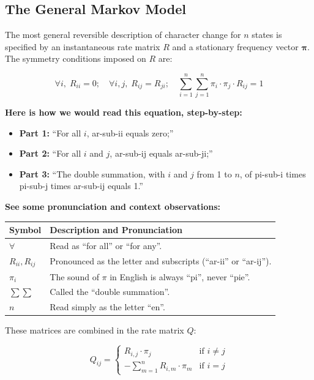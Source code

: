 \subsection{The General Markov Model}

The most general reversible description of character change for $n$ states is specified by an instantaneous rate matrix $R$ and a stationary frequency vector $\symbf{\pi}$. The symmetry conditions imposed on $R$ are:

$$\forall i,\; R_{ii} = 0; \quad \forall i,j,\; R_{ij} = R_{ji}; \quad \sum_{i=1}^{n}\sum_{j=1}^{n} \pi_i \cdot \pi_j \cdot R_{ij} = 1$$

\textbf{Here is how we would read this equation, step-by-step:}

\begin{itemize}
    \item \textbf{Part 1:} ``For all $i$, ar-sub-ii equals zero;''
    \item \textbf{Part 2:} ``For all $i$ and $j$, ar-sub-ij equals ar-sub-ji;''
    \item \textbf{Part 3:} ``The double summation, with $i$ and $j$ from 1 to $n$, of pi-sub-i times pi-sub-j times ar-sub-ij equals 1.''
\end{itemize}

\textbf{See some pronunciation and context observations:}

\begin{center}
\renewcommand{\arraystretch}{1.5}
\begin{tabular}{lp{10cm}}
\toprule
\textbf{Symbol} & \textbf{Description and Pronunciation} \\
\midrule
$\forall$ & Read as ``for all'' or ``for any''. \\
$R_{ii}, R_{ij}$ & Pronounced as the letter and subscripts (``ar-ii'' or ``ar-ij''). \\
$\pi_i$ & The sound of $\pi$ in English is always ``pi'', never ``pie''. \\
$\sum \sum$ & Called the ``double summation''. \\
$n$ & Read simply as the letter ``en''. \\
\bottomrule
\end{tabular}
\end{center}

These matrices are combined in the rate matrix $Q$:

$$Q_{ij} = \begin{cases} R_{i,j} \cdot \pi_j & \text{if } i \neq j \\ -\sum_{m=1}^{n} R_{i,m} \cdot \pi_m & \text{if } i = j \end{cases}$$

